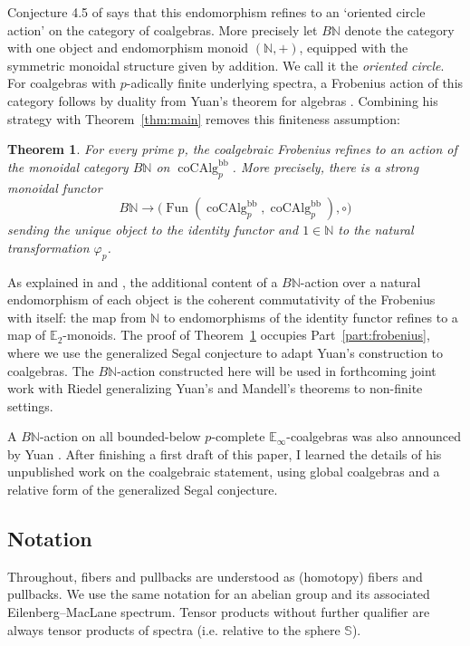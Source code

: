 \documentclass[11pt,a4paper]{article}
\newtheorem{thm}{Theorem}[section]
\theoremstyle{definition}
\newcommand{\coAlg}{\operatorname{coCAlg}}
\newcommand{\Fun}{\operatorname{Fun}}
\begin{document}

Conjecture 4.5 of \cite{Nik} says that this endomorphism refines to an `oriented circle action' on the category of coalgebras. 
More precisely let $B\mathbb N$ denote the category with one object and
endomorphism monoid $(\mathbb N,+)$, equipped with the symmetric
monoidal structure given by addition. We call it the
\emph{oriented circle}. For coalgebras with $p$-adically finite
underlying spectra, a Frobenius action of this category follows
by duality from Yuan's theorem for algebras
\cite[Theorem 6.8]{Yuan}. Combining his strategy with
Theorem~\ref{thm:main} removes this finiteness assumption:

\begin{thm}\label{thm:coalgebra-frobenius-action}
For every prime $p$, the coalgebraic Frobenius refines to an action
of the monoidal category $B\mathbb N$ on $\coAlg_p^{\mathrm{bb}}$.
More precisely, there is a strong monoidal functor
\[
 B\mathbb N\longrightarrow
 \bigl(\Fun(\coAlg_p^{\mathrm{bb}},\coAlg_p^{\mathrm{bb}}),
 \circ\bigr)
\]
sending the unique object to the identity functor and
$1\in\mathbb N$ to the natural transformation $\varphi_p$.
\end{thm}

As explained in \cite[Remark 4.6]{Nik} and
\cite[Remark 1.14]{Yuan}, the additional content of a $B\mathbb N$-action over a natural endomorphism of each object is
the coherent commutativity of the Frobenius with itself:
the map from $\mathbb N$ to endomorphisms of the identity functor
refines to a map of $\mathbb{E}_2$-monoids. The proof of
Theorem~\ref{thm:coalgebra-frobenius-action} occupies
Part~\ref{part:frobenius}, where we use the generalized Segal conjecture
to adapt Yuan's construction to coalgebras.
The $B\mathbb N$-action constructed here will be used in
forthcoming joint work with Riedel generalizing Yuan's and Mandell's theorems to non-finite settings. 

A $B\mathbb N$-action on all bounded-below $p$-complete
$\mathbb E_\infty$-coalgebras was also announced by Yuan
\cite[Remark~1.5 and \S1.6]{Yuan}. After finishing a first draft of this paper, I learned the details of his unpublished work on the coalgebraic statement, using global coalgebras and a relative form of the generalized Segal conjecture.


\subsection*{Notation}
Throughout, fibers and pullbacks are understood as (homotopy) fibers and pullbacks.
We use the same notation for an abelian group and its associated Eilenberg--MacLane spectrum. Tensor products without further qualifier are always tensor products of spectra (i.e. relative to the sphere $\mathbb S$). 
\end{document}
